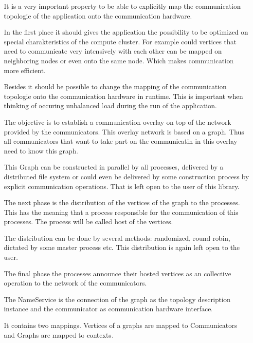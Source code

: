 It is a very important property to be able to explicitly map the
communication topologie of the application onto the communication
hardware.

In the first place it should gives the application the possibility to
be optimized on special charakteristics of the compute cluster. For
example could vertices that need to communicate very intensively with
each other can be mapped on neighboring nodes or even onto the same
node. Which makes communication more efficient.

Besides it should be possible to change the mapping of the
communication topologie onto the communication hardware in
runtime. This is important when thinking of occuring unbalanced load
during the run of the application.

The objective is to establish a communication overlay on top of the
network provided by the communicators. This overlay network is based
on a graph. Thus all communicators that want to take part on the
communicatin in this overlay need to know this graph.

This Graph can be constructed in parallel by all processes, delivered
by a distributed file system or could even be delivered by some
construction process by explicit communication operations. That is
left open to the user of this library.

The next phase is the distribution of the vertices of the graph to the
processes. This has the meaning that a process responsible for the
communication of this processes. The process will be called host of
the vertices.

The distribution can be done by several methods: randomized, round
robin, dictated by some master process etc. This distribution is again
left open to the user.

The final phase the processes announce their hosted vertices as an
collective operation to the network of the communicators.


The NameService is the connection of the graph as the topology
description instance and the communicator as communication hardware
interface.

It contains two mappings. Vertices of a graphs are mapped to
Communicators and Graphs are mapped to contexts.



\begin{itemize}

\end{itemize}


